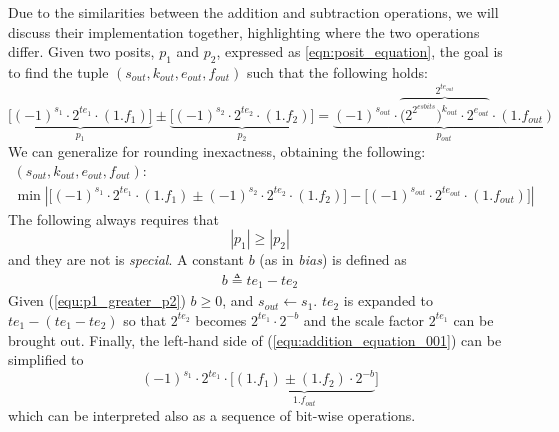 Due to the similarities between the addition and subtraction operations, we will discuss their implementation together, highlighting where the two operations differ.
Given two posits, $p_1$ and $p_2$, expressed as \eqref{eqn:posit_equation}, the goal is to find the tuple $(s_{out}, k_{out}, e_{out}, f_{out})$ such that the following holds:
\begin{equation}\label{equ:addition_equation_001}
    \underbrace{\big[ (-1)^{s_1} \cdot 2^{te_1} \cdot (1.f_1) \big]}_{p_1} \pm \underbrace{\big[ (-1)^{s_2} \cdot 2^{te_2} \cdot (1.f_2) \big]}_{p_2} = \underbrace{ (-1)^{s_{out}} \cdot \overbrace{\big(2^{2^{esbits}}\big)^{k_{out}} \cdot 2^{e_{out}}}^{2^{te_{out}}} \cdot (1.f_{out})}_{p_{out}}
\end{equation}
We can generalize for rounding inexactness, obtaining the following:
\begin{equation}
\begin{gathered}
    (s_{out}, k_{out}, e_{out}, f_{out}): \\
    \min | \big[ (-1)^{s_1} \cdot 2^{te_1} \cdot (1.f_1) \pm (-1)^{s_2} \cdot 2^{te_2} \cdot (1.f_2) \big] - \big[ (-1)^{s_{out}} \cdot 2^{te_{out}} \cdot (1.f_{out}) \big] |
\end{gathered}
\end{equation}
The following always requires that
\begin{equation}\label{equ:p1_greater_p2}
|p_1| \ge |p_2|
\end{equation}
and they are not  is \textit{special}.
A constant $b$ (as in \textit{bias}) is defined as
\begin{equation}\label{equ:b_bias}
\begin{aligned}
b \triangleq te_1 - te_2
\end{aligned}
\end{equation}
Given (\ref{equ:p1_greater_p2}) $b \ge 0$, and $s_{out} \leftarrow s_1$. $te_2$ is expanded to $te_1 - (te_1 - te_2)$ so that $2^{te_2}$ becomes $2^{te_1} \cdot 2^{-b}$ and the scale factor $2^{te_1}$ can be brought out. Finally, the left-hand side of (\ref{equ:addition_equation_001}) can be simplified to
\begin{equation}
(-1)^{s_1} \cdot 2^{te_1} \cdot \big[ \underbrace{(1.f_1) \pm (1.f_2) \cdot 2^{-b}}_{1.f_{out}}\big]
\end{equation}
which can be interpreted also as a sequence of bit-wise operations.

